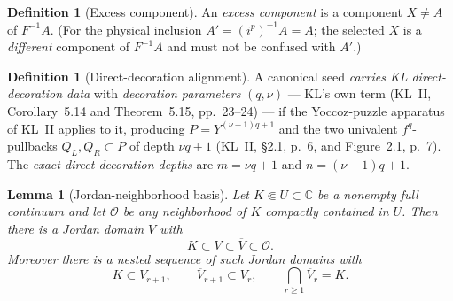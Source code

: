 \documentclass[11pt,reqno]{amsart}
\newtheorem{lemma}[theorem]{Lemma}
\theoremstyle{definition}
\newtheorem{definition}[theorem]{Definition}
\theoremstyle{remark}
\begin{document}
\begin{definition}[Excess component]\label{def:excess}
An \emph{excess component} is a component \(X\ne A\) of \(F^{-1}A\).  (For the physical inclusion \(A'=(i^p)^{-1}A=A\); the selected \(X\) is a \emph{different} component of \(F^{-1}A\) and must not be confused with \(A'\).)
\end{definition}

\begin{definition}[Direct-decoration alignment]\label{def:decoration}
A canonical seed \emph{carries KL direct-decoration data} with \emph{decoration parameters} \((q,\nu)\) --- KL's own term (KL~II, Corollary~5.14 and Theorem~5.15, pp.~23--24) --- if the Yoccoz-puzzle apparatus of KL~II applies to it, producing \(P=Y^{(\nu-1)q+1}\) and the two univalent \(f^q\)-pullbacks \(Q_L,Q_R\subset P\) of depth \(\nu q+1\) (KL~II, \S2.1, p.~6, and Figure~2.1, p.~7).  The \emph{exact direct-decoration depths} are \(m=\nu q+1\) and \(n=(\nu-1)q+1\).
\end{definition}
\begin{lemma}[Jordan-neighborhood basis]\label{lem:jordan-basis}
Let \(K\Subset U\subset\mathbb C\) be a nonempty full continuum and let \(\mathcal O\) be any neighborhood of \(K\) compactly contained in \(U\).  Then there is a Jordan domain \(V\) with
\[
 K\subset V\subset\overline V\subset\mathcal O.               \tag{3.1}
\]
Moreover there is a nested sequence of such Jordan domains with
\[
 K\subset V_{r+1},\qquad \overline V_{r+1}\subset V_r,\qquad \bigcap_{r\ge1}\overline V_r=K.  \tag{3.2}
\]
\end{lemma}
\end{document}
